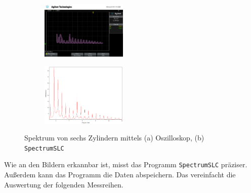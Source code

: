 \begin{figure}
    \begin{subfigure}[c]{width=0.45\textwidth}
        \includegraphics[width=0.45\textwidth]{figure/6Zylinder.png}
    \end{subfigure}
    \begin{subfigure}[c]{width=0.45\textwidth} 
        \includegraphics[width=0.45\textwidth]{figure/6_Zylinder.png}
    \end{subfigure}
    \caption{Spektrum von sechs Zylindern mittels (a) Oszilloskop, (b) \texttt{SpectrumSLC}}
\end{figure}
\FloatBarrier
Wie an den Bildern erkannbar ist, misst das Programm \texttt{SpectrumSLC} präziser. Außerdem kann das Programm die 
Daten abspeichern. Das vereinfacht die Auswertung der folgenden Messreihen.

